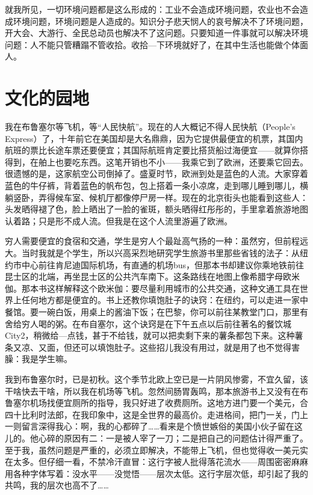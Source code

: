 就我所见，一切环境问题都是这么形成的：工业不会造成环境问题，农业也不会造成环境问题，环境问题是人造成的。知识分子悲天悯人的哀号解决不了环境问题，开大会、大游行、全民总动员也解决不了这问题。只要知道一件事就可以解决环境问题：人不能只管糟蹋不管收拾。收拾—下环境就好了，在其中生活也能做个体面人。
 
\chapter{文化的园地}

我在布鲁塞尔等飞机，等“人民快航”。现在的人大概记不得人民快航（People's Express）了，十年前它在美国却是大名鼎鼎，因为它提供最便宜的机票，其国内航班的票比长途车票还要便宜；其国际航班肯定要比搭货船过海便宜——就算你搭得到，在舶上也要吃东西。这笔开销也不小——我乘它到了欧洲，还要乘它回去。很遗憾的是，这家航空公司倒掉了。盛夏时节，欧洲到处是蓝色的人流。大家穿着蓝色的牛仔裤，背着蓝色的帆布包，包上搭着一条小凉席，走到哪儿睡到哪儿，横躺竖卧，弄得候车室、候机厅都像停尸房一样。现在的北京街头也能看到这些人：头发晒得褪了色，脸上晒出了一脸的雀斑，额头晒得红彤彤的，手里拿着旅游地图认着路；只是形不成人流。但我是在这个人流里游遍了欧洲。 

穷人需要便宜的食宿和交通，学生是穷人个最趾高气扬的一种：虽然穷，但前程远大。当时我就是个学生，所以兴高采烈地研究学生旅游书里那些省钱的法子：从纽约市中心前往肯尼迪国际机场，有直通的机场bus，但那本书却建议你乘地铁前往昆士区的北端，再坐昆士区的公共汽车南下。这条路线在地图上像希腊字母欧米伽。那本书这样解释这个欧米伽：要尽量利用城市的公共交通，这种文通工具在世界上任何地方都是便宜的。书上还教你填饱肚子的诀窍：在纽约，可以走进一家中餐馆。要一碗白饭，用桌上的酱油下饭；在巴黎，你可以前往某教堂门口，那里有舍给穷人喝的粥。在布自塞尔，这个诀窍是在下午五点以后前往著名的餐饮城City2，稍微给—点钱，甚于不给钱，就可以把卖剩下来的薯条都包下来。这种薯条又凉、又面，但还可以填饱肚子。这些招儿我没有用过，就是用了也不觉得害臊：我是学生嘛。 

我到布鲁塞尔时，已是初秋。这个季节北欧上空已是一片阴风惨雾，不宜久留，该干啥快去干啥，所以我在机场等飞机。忽然间肠胃轰鸣，那本旅游书上又没有在布鲁塞尔机场找便宜厕所的指导，我只好进了收费厕所。这地方进门要一个美元，合四十比利时法郎，在我印象中，这是全世界的最高价。走进格间，把门一关，门上一则留言深得我心：啊，我的心都碎了……看来是个愤世嫉俗的美国小伙子留在这儿的。他心碎的原因有二：一是被人宰了一刀；二是把自己的问题估计得严重了。至于我，虽然问题是严重的，必须立即解决，不能带上飞机，但也觉得收一美元实在太多。但仔细一看，不禁冷汗直冒：这行字被人批得落花流水——周围密密麻麻用各种字体写着：没水平——没觉悟——层次太低。这行字层次低，却引起了我的共鸣，我的层次也高不了…… 

